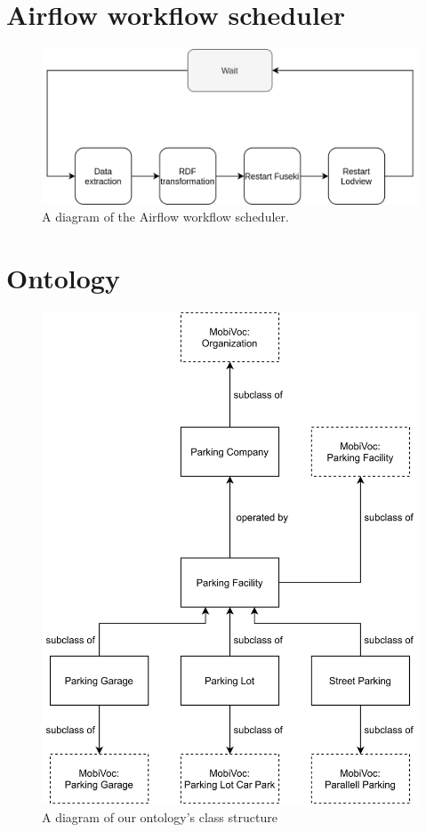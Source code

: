 \chapter{Airflow workflow scheduler}
\label{appendix:airflow}
\begin{figure}[H]
	\centering
	\includegraphics[width=\linewidth]{figures/airflow.png}
	\caption{A diagram of the Airflow workflow scheduler.}
\end{figure}

\chapter{Ontology}
\label{appendix:ontology}
\begin{figure}[H]
	\centering
	\includegraphics[scale=0.18]{figures/ontology-class.png}
	\caption{A diagram of our ontology's class structure}
\end{figure}

